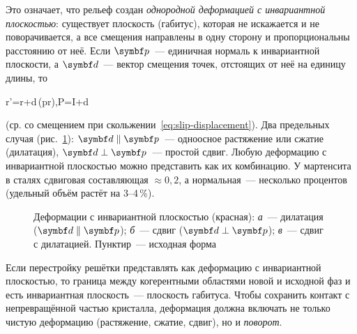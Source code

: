 Это означает, что рельеф создан \emph{однородной деформацией с
инвариантной плоскостью}: существует плоскость (габитус), которая не
искажается и не поворачивается, а все смещения направлены в одну
сторону и пропорциональны расстоянию от неё. Если $\vb p$~— единичная
нормаль к инвариантной плоскости, а $\vb d$~— вектор смещения точек,
отстоящих от неё на единицу длины, то
\begin{keyeq}\label{eq:ips}
\vb r'=\vb r+\vb d\,(\vb p\cdot\vb r),\qquad P=I+\vb d\,
\end{keyeq}
(ср. со смещением при скольжении~\eqref{eq:slip-displacement}). Два
предельных случая (рис.~\ref{fig:ips}): $\vb d\parallel\vb p$~—
одноосное растяжение или сжатие (дилатация), $\vb d\perp\vb p$~— простой
сдвиг. Любую деформацию с инвариантной плоскостью можно представить как
их комбинацию. У мартенсита в сталях сдвиговая составляющая $\approx0{,}2$, а
нормальная~— несколько процентов (удельный объём растёт на 3--4\,\%).

\begin{figure}[ht]
\centering
{}
\caption{Деформации с инвариантной плоскостью (красная): \textit{а}~—
дилатация ($\vb d\parallel\vb p$); \textit{б}~— сдвиг ($\vb d\perp\vb p$);
\textit{в}~— сдвиг с дилатацией. Пунктир~— исходная форма}
\label{fig:ips}
\end{figure}

Если перестройку решётки представлять как деформацию с инвариантной
плоскостью, то граница между когерентными областями новой и исходной фаз
и есть инвариантная плоскость~— плоскость габитуса. Чтобы сохранить
контакт с непревращённой частью кристалла, деформация должна включать не
только чистую деформацию (растяжение, сжатие, сдвиг), но и \emph{поворот}.

